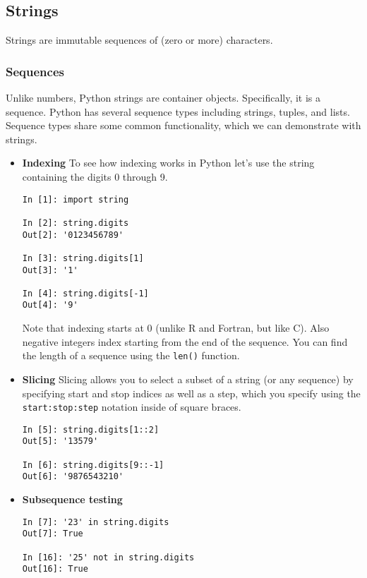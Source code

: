\subsection{Strings}

Strings are immutable sequences of (zero or more) characters.

\subsubsection{Sequences}
Unlike numbers, Python strings are container objects.  Specifically, it is a
sequence.  Python has several sequence types including strings, tuples, and
lists.  Sequence types share some common functionality, which we can
demonstrate with strings.

\begin{itemize}

\item \textbf{Indexing}
To see how indexing works in Python let's use the string containing the digits
0 through 9.
\begin{verbatim}
In [1]: import string

In [2]: string.digits
Out[2]: '0123456789'

In [3]: string.digits[1]
Out[3]: '1'

In [4]: string.digits[-1]
Out[4]: '9'
\end{verbatim}
Note that indexing starts at 0 (unlike R and Fortran, but like C).  Also negative
integers index starting from the end of the sequence. You can find the length of
a sequence using the \texttt{len()} function.

\item \textbf{Slicing}
Slicing allows you to select a subset of a string (or any sequence) by specifying
start and stop indices as well as a step, which you specify using the
\texttt{start:stop:step} notation inside of square braces.
\begin{verbatim}
In [5]: string.digits[1::2]
Out[5]: '13579'

In [6]: string.digits[9::-1]
Out[6]: '9876543210'
\end{verbatim}

\item \textbf{Subsequence testing}
\begin{verbatim}
In [7]: '23' in string.digits
Out[7]: True

In [16]: '25' not in string.digits
Out[16]: True
\end{verbatim}
\end{itemize}

